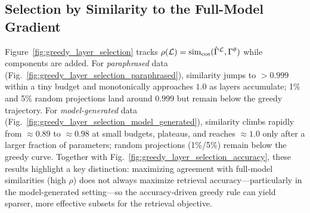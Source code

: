 \subsection{Selection by Similarity to the Full-Model Gradient}
Figure~\ref{fig:greedy_layer_selection} tracks $\rho(\mathcal{L})=\operatorname{sim}_{\cos}(\hat{\Gamma}^{\mathcal{L}},\Gamma^\theta)$ while components are added.
For \emph{paraphrased} data (Fig.~\ref{fig:greedy_layer_selection_paraphrased}), similarity jumps to $>0.999$ within a tiny budget and monotonically approaches $1.0$ as layers accumulate; 1\% and 5\% random projections land around $0.999$ but remain below the greedy trajectory. For \emph{model-generated} data (Fig.~\ref{fig:greedy_layer_selection_model_generated}), similarity climbs rapidly from $\approx0.89$ to $\approx0.98$ at small budgets, plateaus, and reaches $\approx1.0$ only after a larger fraction of parameters; random projections (1\%/5\%) remain below the greedy curve. Together with Fig.~\ref{fig:greedy_layer_selection_accuracy}, these results highlight a key distinction: maximizing agreement with full-model similarities (high $\rho$) does not always maximize retrieval accuracy—particularly in the model-generated setting—so the accuracy-driven greedy rule can yield sparser, more effective subsets for the retrieval objective.

